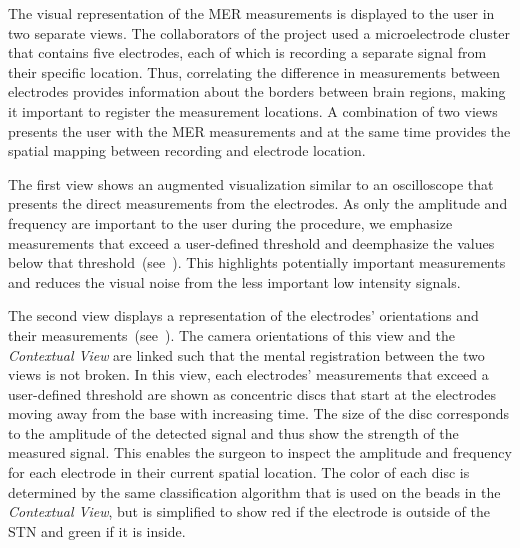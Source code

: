The visual representation of the MER measurements is displayed to the user in two separate views.  The collaborators of the project used a microelectrode cluster that contains five electrodes, each of which is recording a separate signal from their specific location.  Thus, correlating the difference in measurements between electrodes provides information about the borders between brain regions, making it important to register the measurement locations.  A combination of two views presents the user with the MER measurements and at the same time provides the spatial mapping between recording and electrode location.

The first view shows an augmented visualization similar to an oscilloscope that presents the direct measurements from the electrodes.  As only the amplitude and frequency are important to the user during the procedure, we emphasize measurements that exceed a user-defined threshold and deemphasize the values below that threshold~(see~). This highlights potentially important measurements and reduces the visual noise from the less important low intensity signals.

The second view displays a  representation of the electrodes' orientations and their measurements~(see~).  The camera orientations of this view and the \emph{Contextual View} are linked such that the mental registration between the two views is not broken.  In this view, each electrodes' measurements that exceed a user-defined threshold are shown as concentric discs that start at the electrodes moving away from the base with increasing time.  The size of the disc corresponds to the amplitude of the detected signal and thus show the strength of the measured signal.  This enables the surgeon to inspect the amplitude and frequency for each electrode in their current spatial location.  The color of each disc is determined by the same classification algorithm that is used on the beads in the \emph{Contextual View}, but is simplified to show red if the electrode is outside of the STN and green if it is inside.




